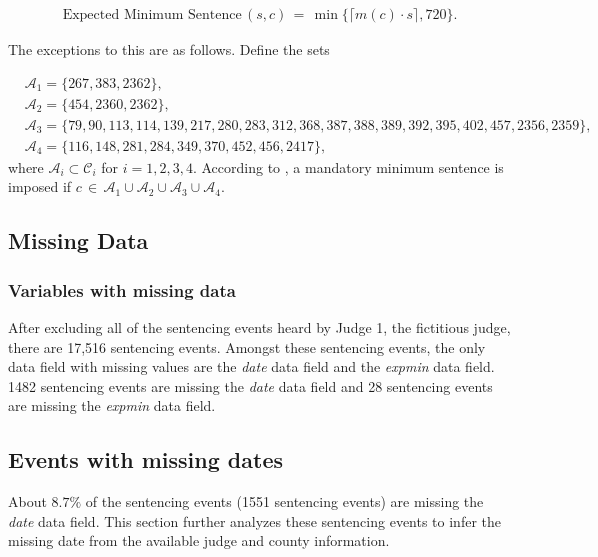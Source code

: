 \documentclass[11pt]{article}
\theoremstyle{ModifiedStyle}
\begin{document}
        \begin{align}
          \text{Expected Minimum Sentence}\,(s,c) \,=\, \min \big\{ \big\lceil m(c) \cdot s \big\rceil ,720 \big\}.
          \label{Equation_Expected_Minimum_Sentence}
        \end{align}

        The exceptions to this are as follows. Define the sets

        \begin{align*}
          &\mathcal{A}_1 = \{267, 383, 2362\},\\
          &\mathcal{A}_2 = \{454, 2360, 2362\},\\
          &\mathcal{A}_3 = \{79, 90, 113, 114, 139, 217, 280, 283, 312, 368, 387, 388, 389, 392, 395, 402, 457, 2356, 2359\}, \\ &\mathcal{A}_4 = \{116, 148, 281, 284, 349, 370, 452, 456, 2417\},
        \end{align*}
        where $\mathcal{A}_i \subset \mathcal{C}_i$ for $i=1,2,3,4$. According to \cite{hester2017conditional}, a mandatory minimum sentence is imposed if $c \,\in\, \mathcal{A}_1 \cup \mathcal{A}_2 \cup \mathcal{A}_3 \cup \mathcal{A}_4$.

  \subsection{Missing Data}
    \subsubsection{Variables with missing data}
      After excluding all of the sentencing events heard by Judge 1, the fictitious judge, there are 17,516 sentencing events. Amongst these sentencing events, the only data field with missing values are the \emph{date} data field and the \emph{expmin} data field. 1482 sentencing events are missing the \emph{date} data field and 28 sentencing events are missing the \emph{expmin} data field.

    \subsection{Events with missing dates}
      \label{Sec:Appendix:Missing_Dates}
      About $8.7\%$ of the sentencing events (1551 sentencing events) are missing the \emph{date} data field. This section further analyzes these sentencing events to infer the missing date from the available judge and county information.
\end{document}
